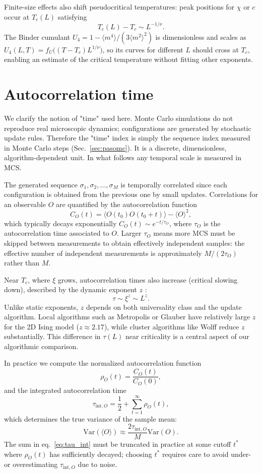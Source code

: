 Finite-size effects also shift pseudocritical temperatures: peak positions for $\chi$ or $c$ occur at $T_c(L)$ satisfying
\[ T_c(L)-T_c\sim L^{-1/\nu}. \]
The Binder cumulant $U_4=1-\langle m^4\rangle/(3\langle m^2\rangle^2)$ \citep{Binder1981} is dimensionless and scales as $U_4(L,T)=f_U\big((T-T_c)L^{1/\nu}\big)$, so its curves for different $L$ should cross at $T_c$, enabling an estimate of the critical temperature without fitting other exponents.

\section{Autocorrelation time} \label{sec:csd}

We clarify the notion of "time" used here. Monte Carlo simulations do not reproduce real microscopic dynamics; configurations are generated by stochastic update rules. Therefore the "time" index is simply the sequence index measured in Monte Carlo steps (Sec.~\ref{sec:pasomc}). It is a discrete, dimensionless, algorithm-dependent unit. In what follows any temporal scale is measured in MCS.

The generated sequence $\sigma_1,\sigma_2,\dots,\sigma_M$ is temporally correlated since each configuration is obtained from the previous one by small updates. Correlations for an observable $O$ are quantified by the autocorrelation function \citep{LandauBinder}
\[ C_O(t)=\langle O(t_0)O(t_0+t)\rangle-\langle O\rangle^2, \]
which typically decays exponentially $C_O(t)\sim e^{-t/\tau_O}$, where $\tau_O$ is the autocorrelation time associated to $O$. Larger $\tau_O$ means more MCS must be skipped between measurements to obtain effectively independent samples: the effective number of independent measurements is approximately $M/(2\tau_O)$ rather than $M$.

Near $T_c$, where $\xi$ grows, autocorrelation times also increase (critical slowing down), described by the dynamic exponent $z$ \citep{HohenbergHalperin1977}:
\[ \tau\sim\xi^z\sim L^z. \]
Unlike static exponents, $z$ depends on both universality class and the update algorithm. Local algorithms such as Metropolis or Glauber have relatively large $z$ for the 2D Ising model ($z\approx2.17$), while cluster algorithms \citep{SwendsenWang1987} like Wolff reduce $z$ substantially. This difference in $\tau(L)$ near criticality is a central aspect of our algorithmic comparison.

In practice we compute the normalized autocorrelation function
\[ \rho_O(t)=\frac{C_O(t)}{C_O(0)}, \]
and the integrated autocorrelation time
\begin{equation} \label{eq:tau_int}
    \tau_{\mathrm{int},O}=\frac{1}{2}+\sum_{t=1}^{\infty}\rho_O(t),
\end{equation}
which determines the true variance of the sample mean:
\[ \mathrm{Var}(\langle O\rangle)\approx\frac{2\tau_{\mathrm{int},O}}{M}\mathrm{Var}(O). \]
The sum in eq.~\eqref{eq:tau_int} must be truncated in practice at some cutoff $t^*$ where $\rho_O(t)$ has sufficiently decayed; choosing $t^*$ requires care to avoid under- or overestimating $\tau_{\mathrm{int},O}$ due to noise.